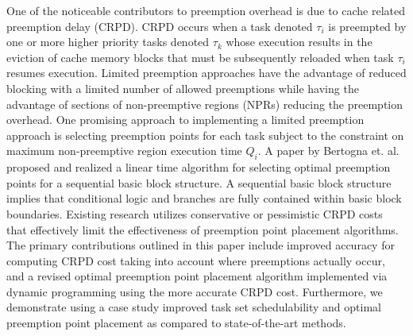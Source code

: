 One of the noticeable contributors to preemption overhead is due to cache related preemption delay (CRPD).  CRPD occurs when a task denoted \begin{math}\tau_{i}\end{math} is preempted by one or more higher priority tasks denoted \begin{math}\tau_{k}\end{math} whose execution results in the eviction of cache memory blocks that must be subsequently reloaded when task \begin{math}\tau_{i}\end{math} resumes execution.  Limited preemption approaches have the advantage of reduced blocking with a limited number of allowed preemptions while having the advantage of sections of non-preemptive regions (NPRs) reducing the preemption overhead.  One promising approach to implementing a limited preemption approach is selecting preemption points for each task subject to the constraint on maximum non-preemptive region execution time \begin{math}Q_{i}\end{math}.  A paper by Bertogna et. al.~\cite{bertogna:11} proposed and realized a linear time algorithm for selecting optimal preemption points for a sequential basic block structure.  A sequential basic block structure implies that conditional logic and branches are fully contained within basic block boundaries. 
Existing research utilizes conservative or pessimistic CRPD costs that effectively limit the effectiveness of preemption point placement algorithms.
The primary contributions outlined in this paper include improved accuracy for computing CRPD cost taking into account where preemptions actually occur, and a revised optimal preemption point placement algorithm implemented via dynamic programming using the more accurate CRPD cost.  Furthermore, we demonstrate using a case study improved task set schedulability and optimal preemption point placement as compared to state-of-the-art methods.


